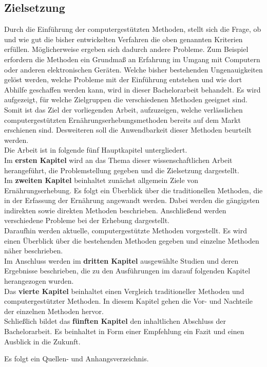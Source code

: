 \subsection{Zielsetzung}


Durch die Einführung der computergestützten Methoden, stellt sich die Frage, ob und wie gut die bisher entwickelten Verfahren die oben genannten Kriterien erfüllen. Möglicherweise ergeben sich dadurch andere Probleme. Zum Beispiel erfordern die Methoden ein Grundmaß an Erfahrung im Umgang mit Computern oder anderen elektronischen Geräten. Welche bisher bestehenden Ungenauigkeiten gelöst werden, welche Probleme mit der Einführung entstehen und wie dort Abhilfe geschaffen werden kann, wird in dieser Bachelorarbeit behandelt. Es wird aufgezeigt, für welche Zielgruppen die verschiedenen Methoden geeignet sind.\\
Somit ist das Ziel der vorliegenden Arbeit, aufzuzeigen, welche verlässlichen computergestützten Ernährungserhebungsmethoden bereits auf dem Markt erschienen sind. Desweiteren soll die Anwendbarkeit dieser Methoden beurteilt werden. \\

Die Arbeit ist in folgende fünf Hauptkapitel untergliedert.\\
Im \textbf{ersten Kapitel} wird an das Thema dieser wissenschaftlichen Arbeit herangeführt, die Problemstellung gegeben und die Zielsetzung dargestellt. \\
Im \textbf{zweiten Kapitel} beinhaltet zunächst allgemein Ziele von Ernährungserhebung. Es folgt ein Überblick über die traditionellen Methoden, die in der Erfassung der Ernährung angewandt werden. Dabei werden die gängigsten indirekten sowie direkten Methoden beschrieben. Anschließend werden verschiedene Probleme bei der Erhebung dargestellt.\\
Daraufhin werden aktuelle, computergestützte Methoden vorgestellt. Es wird einen Überblick über die bestehenden Methoden gegeben und einzelne Methoden näher beschrieben. \\
Im Anschluss werden im \textbf{dritten Kapitel} ausgewählte Studien und deren Ergebnisse beschrieben, die zu den Ausführungen im darauf folgenden Kapitel herangezogen wurden. \\
Das \textbf{vierte Kapitel} beinhaltet einen Vergleich traditioneller Methoden und computergestützter Methoden. In diesem Kapitel gehen die Vor- und Nachteile der einzelnen Methoden hervor. \\
Schließlich bildet das \textbf{fünften Kapitel} den inhaltlichen Abschluss der Bachelorarbeit. Es beinhaltet in Form einer Empfehlung ein Fazit und einen Ausblick in die Zukunft.

Es folgt ein Quellen- und Anhangsverzeichnis. 

